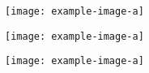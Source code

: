 \documentclass{article}
\begin{document}
\begin{answer}[title=Plot 2,height=9.5cm,width=\linewidth]
\centering
\texttt{[image: example-image-a]}
\end{answer}

\begin{answer}[title=Plot 3,height=9.5cm,width=\linewidth]
\centering
\texttt{[image: example-image-a]}
\end{answer}

\begin{answer}[title=Plot 4,height=9.5cm,width=\linewidth]
\centering
\texttt{[image: example-image-a]}
\end{answer}
\end{document}
